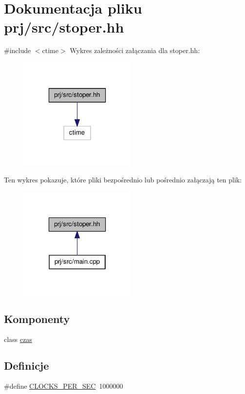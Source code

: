 \hypertarget{stoper_8hh}{\section{\-Dokumentacja pliku prj/src/stoper.hh}
\label{stoper_8hh}
}
{\ttfamily \#include $<$ctime$>$}\*
\-Wykres zależności załączania dla stoper.\-hh\-:\nopagebreak
\begin{figure}[H]
\begin{center}
\leavevmode
\includegraphics[width=166pt]{stoper_8hh__incl}
\end{center}
\end{figure}
\-Ten wykres pokazuje, które pliki bezpośrednio lub pośrednio załączają ten plik\-:\nopagebreak
\begin{figure}[H]
\begin{center}
\leavevmode
\includegraphics[width=166pt]{stoper_8hh__dep__incl}
\end{center}
\end{figure}
\subsection*{\-Komponenty}
\begin{DoxyCompactItemize}
\item 
class \hyperlink{classczas}{czas}
\end{DoxyCompactItemize}
\subsection*{\-Definicje}
\begin{DoxyCompactItemize}
\item 
\#define \hyperlink{stoper_8hh_a3d9fc3c745d0880902fe3ea3d5d5f71e}{\-C\-L\-O\-C\-K\-S\-\_\-\-P\-E\-R\-\_\-\-S\-E\-C}~1000000
\end{DoxyCompactItemize}



